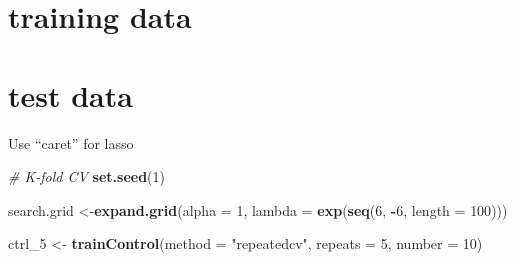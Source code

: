 \documentclass[
]{article}
\newenvironment{Shaded}{\begin{snugshade}}{\end{snugshade}}
\newcommand{\AttributeTok}[1]{\textcolor[rgb]{0.13,0.29,0.53}{#1}}
\newcommand{\CommentTok}[1]{\textcolor[rgb]{0.56,0.35,0.01}{\textit{#1}}}
\newcommand{\DecValTok}[1]{\textcolor[rgb]{0.00,0.00,0.81}{#1}}
\newcommand{\FunctionTok}[1]{\textcolor[rgb]{0.13,0.29,0.53}{\textbf{#1}}}
\newcommand{\NormalTok}[1]{#1}
\newcommand{\OtherTok}[1]{\textcolor[rgb]{0.56,0.35,0.01}{#1}}
\newcommand{\SpecialCharTok}[1]{\textcolor[rgb]{0.81,0.36,0.00}{\textbf{#1}}}
\newcommand{\StringTok}[1]{\textcolor[rgb]{0.31,0.60,0.02}{#1}}
\begin{document}
\section{training data}\label{training-data}

\begin{Shaded}
\end{Shaded}

\section{test data}\label{test-data}

\begin{Shaded}
\end{Shaded}

Use ``caret'' for lasso

\begin{Shaded}
\begin{Highlighting}[]
\CommentTok{\# K{-}fold CV}
\FunctionTok{set.seed}\NormalTok{(}\DecValTok{1}\NormalTok{)}

\NormalTok{search.grid }\OtherTok{\textless{}{-}}\FunctionTok{expand.grid}\NormalTok{(}\AttributeTok{alpha =} \DecValTok{1}\NormalTok{,}
                          \AttributeTok{lambda =} \FunctionTok{exp}\NormalTok{(}\FunctionTok{seq}\NormalTok{(}\DecValTok{6}\NormalTok{, }\SpecialCharTok{{-}}\DecValTok{6}\NormalTok{, }\AttributeTok{length =} \DecValTok{100}\NormalTok{)))}

\NormalTok{ctrl\_5 }\OtherTok{\textless{}{-}} \FunctionTok{trainControl}\NormalTok{(}\AttributeTok{method =} \StringTok{"repeatedcv"}\NormalTok{, }\AttributeTok{repeats =} \DecValTok{5}\NormalTok{, }\AttributeTok{number =} \DecValTok{10}\NormalTok{)}
\end{Highlighting}
\end{Shaded}
\end{document}
